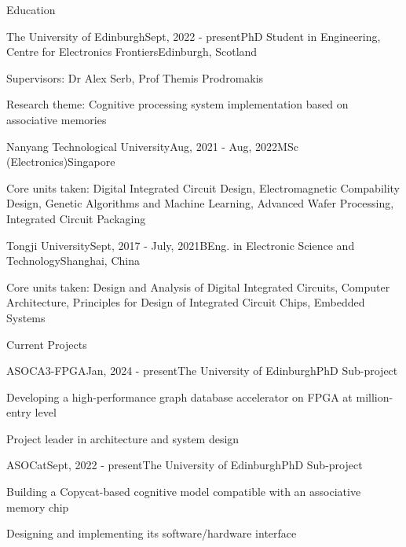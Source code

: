 \documentclass{resume} %
\begin{document}

\begin{rSection}{Education}

	\begin{rSubsection}{The University of Edinburgh}{Sept, 2022 - present}{PhD Student in Engineering, Centre for Electronics Frontiers}{Edinburgh, Scotland}
		\item Supervisors: Dr Alex Serb, Prof Themis Prodromakis
		\item Research theme: Cognitive processing system implementation based on associative memories
	\end{rSubsection}
	
	\begin{rSubsection}{Nanyang Technological University}{Aug, 2021 - Aug, 2022}{MSc (Electronics)}{Singapore}
		\item Core units taken: Digital Integrated Circuit Design, Electromagnetic Compability Design, Genetic Algorithms and Machine Learning, Advanced Wafer Processing, Integrated Circuit Packaging
	\end{rSubsection}

	\begin{rSubsection}{Tongji University}{Sept, 2017 - July, 2021}{BEng. in Electronic Science and Technology}{Shanghai, China}
		\item Core units taken: Design and Analysis of Digital Integrated Circuits, Computer Architecture, Principles for Design of Integrated Circuit Chips, Embedded Systems
	\end{rSubsection}

\end{rSection}

\begin{rSection}{Current Projects}
	
	\begin{rSubsection}{ASOCA3-FPGA}{Jan, 2024 - present}{The University of Edinburgh}{PhD Sub-project}
		\item Developing a high-performance graph database accelerator on FPGA at million-entry level
		\item Project leader in architecture and system design
	\end{rSubsection}
	
	\begin{rSubsection}{ASOCat}{Sept, 2022 - present}{The University of Edinburgh}{PhD Sub-project}
		\item Building a Copycat-based cognitive model compatible with an associative memory chip
		\item Designing and implementing its software/hardware interface
	\end{rSubsection}

\end{rSection}
\end{document}

